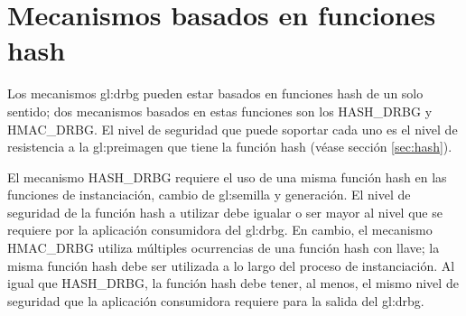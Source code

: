 %
%
\section{Mecanismos basados en funciones hash}

Los mecanismos \gls{gl:drbg} pueden estar basados en funciones hash de un
solo sentido; dos mecanismos basados en estas funciones son los HASH\_DRBG
y HMAC\_DRBG. El nivel de seguridad que puede soportar cada uno es el nivel de
resistencia a la \gls{gl:preimagen} que tiene la función hash (véase sección
\ref{sec:hash}).

El mecanismo HASH\_DRBG requiere el uso de una misma función hash en las
funciones de instanciación, cambio de \gls{gl:semilla} y generación. El nivel
de seguridad de la función hash a utilizar debe igualar o ser mayor al
nivel que se requiere por la aplicación consumidora del \gls{gl:drbg}. En
cambio, el mecanismo HMAC\_DRBG utiliza múltiples ocurrencias de una función
hash con llave; la misma función hash debe ser utilizada a lo largo del proceso
de instanciación. Al igual que HASH\_DRBG, la función hash debe tener, al menos,
el mismo nivel de seguridad que la aplicación consumidora requiere para la
salida del \gls{gl:drbg}.
